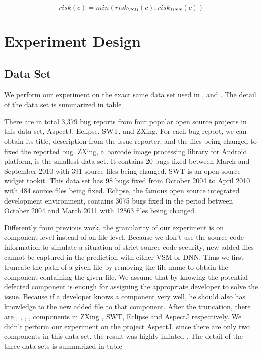 \begin{equation}
risk(c) = min(risk_{VSM}(c) , risk_{DNN}(c) )
\end{equation}



 
\section{Experiment Design}

\subsection{Data Set }
We perform our experiment on the exact same data set used in \cite{wang2014version} ,\cite{saha2013improving} and \cite{zhou2012should}.
The detail of the data set is summarized in table 


There are in total 3,379 bug reports from four popular open source projects in this data set, AspectJ, Eclipse, SWT, and ZXing. 
For each bug report, we can obtain its title, description from the issue reporter, and the files being changed to fixed the reported bug. 
ZXing, a barcode image processing library for Android platform, is the smallest data set.
It contains 20 bugs fixed between March and September 2010 with 391 source files being changed.
SWT is an open source widget tookit. 
This data set has 98 bugs fixed from October 2004 to April 2010 with 484 source files being fixed. 
Eclipse, the famous open source integrated development environment, contains 3075 bugs fixed in the period between October 2004 and March 2011 with 12863 files being changed.

Differently from previous work, the granularity of our experiment is on component level instead of on file level. 
Because we don't use the source code information to simulate a situation of strict source code security, new added files cannot be captured in the prediction with either VSM or DNN.
Thus we first truncate the path of a given file by removing the file name to obtain the component containing the given file. 
We assume that by knowing the potential defected component is enough for assigning the appropriate developer to solve the issue.
Because if a developer knows a component very well, he should also has knowledge to the new added file to that component.
After the truncation, there are , , , , components in ZXing , SWT, Eclipse and AspectJ respectively. 
We didn't perform our experiment on the project AspectJ, since there are only two components in this data set, the result was highly inflated . 
The detail of the three data sets is summarized in table 

